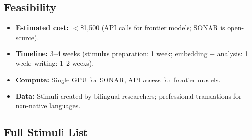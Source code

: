 \documentclass[11pt]{article}
\theoremstyle{definition}
\begin{document}
\subsection{Feasibility}

\begin{itemize}[nosep]
  \item \textbf{Estimated cost:} $<$\$1{,}500 (API calls for frontier models; SONAR is open-source).
  \item \textbf{Timeline:} 3--4 weeks (stimulus preparation: 1 week; embedding + analysis: 1 week; writing: 1--2 weeks).
  \item \textbf{Compute:} Single GPU for SONAR; API access for frontier models.
  \item \textbf{Data:} Stimuli created by bilingual researchers; professional translations for non-native languages.
\end{itemize}

\subsection{Full Stimuli List}
\end{document}
